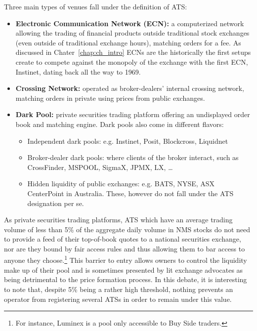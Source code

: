 Three main types of venues fall under the definition of ATS:

\begin{itemize}
\item{\textbf{Electronic Communication Network (ECN):}} a computerized network allowing the trading of financial products outside traditional stock exchanges (even outside of traditional exchange hours), matching orders for a fee. As discussed in Chater~\ref{chap:ch_intro} ECNs are the historically the first setups create to compete against the monopoly of the exchange with the first ECN, Instinet, dating back all the way to 1969. 

\item{\textbf{Crossing Network:}} operated as broker-dealers' internal crossing network, matching orders in private using prices from public exchanges.

\item{\textbf{Dark Pool:}} private securities trading platform offering an undisplayed order book and matching engine. Dark pools also come in different flavors:
        \begin{itemize}
        \item{Independent dark pools:} e.g. Instinet, Posit, Blockcross, Liquidnet 
        \item{Broker-dealer dark pools:} where clients of the broker interact, such as  CrossFinder, MSPOOL, SigmaX, JPMX, LX, \dots
        \item{Hidden liquidity of public exchanges:} e.g. BATS, NYSE, ASX CenterPoint in Australia. These, however do not fall under the ATS designation per se.
        \end{itemize}
\end{itemize}


As private securities trading platforms, ATS which have an average trading volume of less than 5\% of the aggregate daily volume in NMS stocks do not need to provide a feed of their top-of-book quotes to a national securities exchange, nor are they bound by fair access rules and thus allowing them to bar access to anyone they choose.\footnote{For instance, Luminex is a pool only accessible to Buy Side traders.} This barrier to entry allows owners to control the liquidity make up of their pool and is sometimes presented by lit exchange advocates as being detrimental to the price formation process. In this debate, it is interesting to note that, despite 5\% being a rather high threshold, nothing prevents an operator from registering several ATSs in order to remain under this value.


